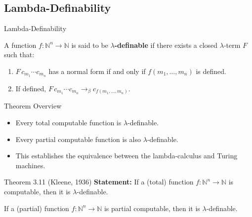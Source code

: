 \documentclass{beamer}
\begin{document}
\subsection{Lambda-Definability}
\begin{frame}{Lambda-Definability}
  \begin{definition}
    A function \(f: \mathbb{N}^n \to \mathbb{N}\) is said to be \textbf{\(\lambda\)-definable} if there exists a closed \(\lambda\)-term \(F\) such that:
    \begin{enumerate}
      \item \(F\,c_{m_1}\cdots c_{m_n}\) has a normal form if and only if \(f(m_1,\dots,m_n)\) is defined.
      \item If defined, \(F\,c_{m_1}\cdots c_{m_n} \rightarrow_\beta c_{f(m_1,\dots,m_n)}\).
    \end{enumerate}
  \end{definition}
\end{frame}

\begin{frame}{Theorem Overview}
  \begin{itemize}
    \item Every total computable function is \(\lambda\)-definable.
    \item Every partial computable function is also \(\lambda\)-definable.
    \item This establishes the equivalence between the lambda-calculus and Turing machines.
  \end{itemize}
\end{frame}

\begin{frame}{Theorem 3.11 (Kleene, 1936)}
  \textbf{Statement:} If a (total) function $f: \mathbb{N}^n \to \mathbb{N}$ is computable, then it is $\lambda$-definable.
  
  If a (partial) function $f: \mathbb{N}^n \to \mathbb{N}$ is partial computable, then it is $\lambda$-definable.
\end{frame}
\end{document}
